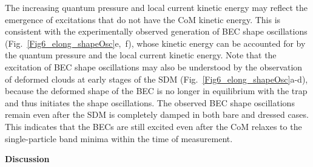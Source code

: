 \documentclass[showpacs,preprintnumbers,amsmath,amssymb, superscriptaddress, aps, reprint]{revtex4-1}
\begin{document}
{{{\begin{figure}[ht]
\label{Fig7_eff_interaction}
\end{figure}
{The increasing quantum pressure and local current kinetic energy may reflect the emergence of excitations that do not have the CoM kinetic energy. This is consistent with the experimentally observed generation of BEC shape oscillations} {(Fig.~{\ref{Fig6_elong_shapeOsc}e,~f}), whose kinetic energy can be accounted for by the quantum pressure and the local current kinetic energy. Note that the excitation of BEC shape oscillations may also be understood by the observation of deformed clouds at early stages of the SDM (Fig.~{\ref{Fig6_elong_shapeOsc}}a-d), because the deformed shape of the BEC is no longer in equilibrium with the trap and thus initiates the shape oscillations.} 
The observed BEC shape oscillations remain even after the SDM is completely damped in both bare and dressed cases. This indicates that the BECs are still excited even after the CoM relaxes to the single-particle band minima within the time of measurement.



\begin{flushleft}
{\textbf{Discussion}}
\end{flushleft}

}}}
\end{document}
